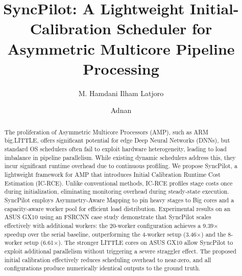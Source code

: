\documentclass[runningheads]{llncs}
\begin{document}
\title{SyncPilot: A Lightweight Initial-Calibration Scheduler for Asymmetric Multicore Pipeline Processing}


\author{M. Hamdani Ilham Latjoro \and
Adnan}



\maketitle

\begin{abstract}
The proliferation of Asymmetric Multicore Processors (AMP), such as ARM big.LITTLE, offers significant potential for edge Deep Neural Networks (DNNs), but standard OS schedulers often fail to exploit hardware heterogeneity, leading to load imbalance in pipeline parallelism. While existing dynamic schedulers address this, they incur significant runtime overhead due to continuous profiling. We propose SyncPilot, a lightweight framework for AMP that introduces Initial Calibration Runtime Cost Estimation (IC-RCE). Unlike conventional methods, IC-RCE profiles stage costs once during initialization, eliminating monitoring overhead during steady-state execution. SyncPilot employs Asymmetry-Aware Mapping to pin heavy stages to Big cores and a capacity-aware worker pool for efficient load distribution. Experimental results on an ASUS GX10 using an FSRCNN case study demonstrate that SyncPilot scales effectively with additional workers: the 20-worker configuration achieves a 9.39$\times$ speedup over the serial baseline, outperforming the 4-worker setup (3.46$\times$) and the 8-worker setup (6.61$\times$). The stronger LITTLE cores on ASUS GX10 allow SyncPilot to exploit additional parallelism without triggering a severe straggler effect. The proposed initial calibration effectively reduces scheduling overhead to near-zero, and all configurations produce numerically identical outputs to the ground truth.

\end{abstract}
\end{document}
